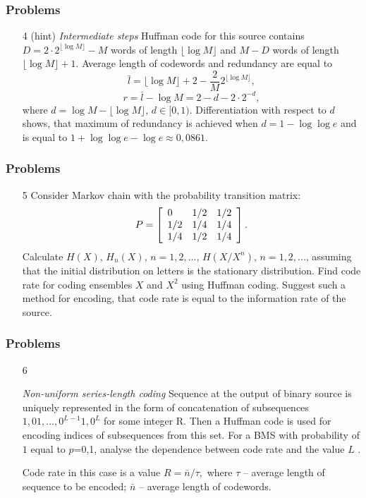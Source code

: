 \documentclass[14pt]{beamer}
\begin{document}
\begin{frame}
\frametitle{Problems}
\begin{enumerate}
   
  \item[4 (hint)] 
  \small{ \emph{Intermediate steps} Huffman code for this source contains $D=2\cdot 2^{\lfloor \log M \rfloor} - M$ words of length 
$\lfloor \log M \rfloor$ and  $M-D$ words of length $\lfloor \log M
\rfloor+1$. Average length of codewords and redundancy are equal to 
\[
\bar l =\lfloor \log M \rfloor+2-\frac{2}{M}%
2^{\lfloor \log M \rfloor},
\]
\[
r=\bar l - \log M= 2-d-2\cdot 2^{-d},
\]
where $d=\log M - \lfloor \log M \rfloor$, $d\in[0,1)$.
Differentiation with respect to $d$ shows, that maximum of redundancy is achieved when $d=1-\log\log e$ and is equal to $1+\log\log e - \log e
\approx 0,0861$.
  }
\end{enumerate}
\end{frame}


\begin{frame}
\frametitle{Problems}
\begin{enumerate}
  
  \item[5] 
  \small{ Consider Markov chain with the probability transition matrix:
\[
P = \left[ {{\begin{array}{*{20}c}
 0 \hfill & {1 / 2} \hfill & {1 / 2} \hfill \\
 {1 / 2} \hfill & {1 / 4} \hfill & {1 / 4} \hfill \\
 {1 / 4} \hfill & {1 / 2} \hfill & {1 / 4} \hfill \\
\end{array} }} \right].
\]
  Calculate $H\left( X \right)$, $H_n \left( X \right)$,  $n = 1,2,...$, $H\left( {X / X^n} \right)$, $n = 1,2,...$, assuming that the initial distribution on letters is the stationary distribution.
  Find code rate for coding ensembles $X$ and $X^2$ using Huffman coding. Suggest such a method for encoding, that code rate is equal to the information rate of the source. 
  }
\end{enumerate}
\end{frame}


\begin{frame}
\frametitle{Problems}
\begin{enumerate}
  \item[6] \small{  \emph{Non-uniform series-length coding} 
  Sequence at the output of binary source is uniquely represented in the form of concatenation of subsequences $1,01,...,0^{L - 1}1,0^L$ for some integer R. 
  Then a Huffman code is used for encoding indices of subsequences from this set.
  For a BMS with probability of $1$ equal to $p$=0,1, analyse the dependence between code rate and the value $L$ . 
  
  Code rate in this case is a value $R = \bar{n} / \tau ,$ where \textit{$\tau $} -- average length of sequence to be encoded; $\bar {n}$ -- average length of codewords.
}
\end{enumerate}
\end{frame}
\end{document}
